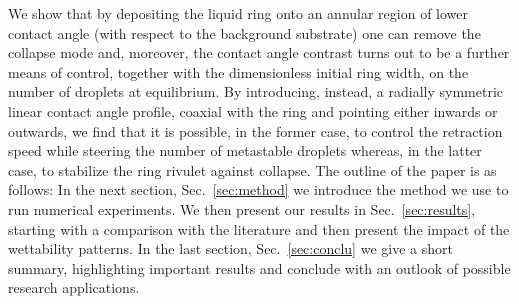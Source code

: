 \documentclass[twoside,twocolumn,9pt]{article}
\begin{document}
We show that by depositing the liquid ring onto an annular region of lower contact angle (with respect to the background substrate) one can remove the collapse mode and, moreover, the contact angle contrast turns out to be a further means of control, together with the dimensionless initial ring width, on the number of droplets at equilibrium.
By introducing, instead, a radially symmetric linear contact angle profile, coaxial with the ring and pointing either inwards or outwards, we find that it is possible, in the former case, to control the retraction speed while steering the number of metastable droplets whereas, in the latter case, to stabilize the ring rivulet against collapse.
The outline of the paper is as follows: In the next section, Sec.~\ref{sec:method} we introduce the method we use to run numerical experiments.
We then present our results in Sec.~\ref{sec:results}, starting with a comparison with the literature and then present the impact of the wettability patterns.
In the last section, Sec.~\ref{sec:conclu} we give a short summary, highlighting important results and conclude with an outlook of possible research applications.
\end{document}
